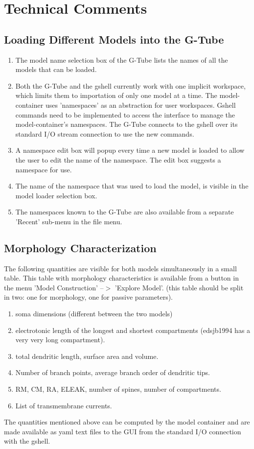\documentclass[12pt]{article}
\begin{document}
\section{Technical Comments}
\label{sec:technical-comments}

\subsection{Loading Different Models into the G-Tube}

\begin{enumerate}
\item The model name selection box of the G-Tube lists the names of
  all the models that can be loaded.
\item Both the G-Tube and the gshell currently work with one implicit
  workspace, which limits them to importation of only one model at a
  time.  The model-container uses 'namespaces' as an abstraction for
  user workspaces.  Gshell commands need to be implemented to access
  the interface to manage the model-container's namespaces.  The
  G-Tube connects to the gshell over its standard I/O stream
  connection to use the new commands.
\item A namespace edit box will popup every time a new model is loaded
  to allow the user to edit the name of the namespace.  The edit box
  suggests a namespace for use.
\item The name of the namespace that was used to load the model, is
  visible in the model loader selection box.
\item The namespaces known to the G-Tube are also available from a
  separate 'Recent' sub-menu in the file menu.
\end{enumerate}


\subsection{Morphology Characterization}
The following quantities are visible for both models simultaneously
in a small table.  This table with morphology characteristics is
available from a button in the menu 'Model Construction' --$>$
'Explore Model'.  (this table should be split in two: one for
morphology, one for passive parameters).
\begin{enumerate}
\item soma dimensions (different between the two models)
\item electrotonic length of the longest and shortest compartments
  (edsjb1994 has a very very long compartment).
\item total dendritic length, surface area and volume.
\item Number of branch points, average branch order of dendritic tips.
\item RM, CM, RA, ELEAK, number of spines, number of compartments.
\item List of transmembrane currents.
\end{enumerate}
The quantities mentioned above can be computed by the model container
and are made available as yaml text files to the GUI from the standard
I/O connection with the gshell.
\end{document}
